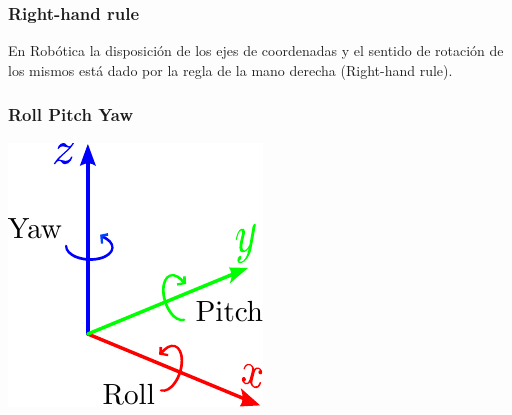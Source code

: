 \begin{frame}
    \frametitle{Right-hand rule}
    En Robótica la disposición de los ejes de coordenadas y el sentido de rotación de los mismos está dado por la regla de la mano derecha (Right-hand rule).

    \begin{figure}[!h]
        \centering
        \hfill
    \end{figure}
\end{frame}

\begin{frame}
    \frametitle{Roll Pitch Yaw }
        \includegraphics[width=0.5\columnwidth]{./images/roll_pitch_yaw.pdf}

\end{frame}

